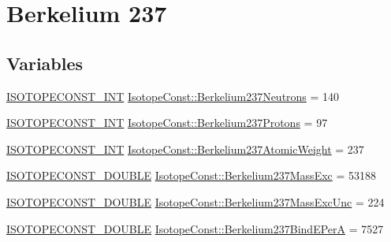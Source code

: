 \hypertarget{group___isotope_const-_berkelium-_bk237}{}\section{Berkelium 237}
\label{group___isotope_const-_berkelium-_bk237}
\subsection*{Variables}
\begin{DoxyCompactItemize}
\item 
\mbox{\hyperlink{group___isotope_const-_macros_ga5f18360b3e99483a35c32d789e62621c}{I\+S\+O\+T\+O\+P\+E\+C\+O\+N\+S\+T\+\_\+\+I\+NT}} \mbox{\hyperlink{group___isotope_const-_berkelium-_bk237_gae95d269089a2bb50e2aa6d2c2cc1bcd0}{Isotope\+Const\+::\+Berkelium237\+Neutrons}} = 140
\item 
\mbox{\hyperlink{group___isotope_const-_macros_ga5f18360b3e99483a35c32d789e62621c}{I\+S\+O\+T\+O\+P\+E\+C\+O\+N\+S\+T\+\_\+\+I\+NT}} \mbox{\hyperlink{group___isotope_const-_berkelium-_bk237_ga036c18d60d24a4ad4eab319d7913ff23}{Isotope\+Const\+::\+Berkelium237\+Protons}} = 97
\item 
\mbox{\hyperlink{group___isotope_const-_macros_ga5f18360b3e99483a35c32d789e62621c}{I\+S\+O\+T\+O\+P\+E\+C\+O\+N\+S\+T\+\_\+\+I\+NT}} \mbox{\hyperlink{group___isotope_const-_berkelium-_bk237_ga5a668f442bee476a015ca5ce9e49564a}{Isotope\+Const\+::\+Berkelium237\+Atomic\+Weight}} = 237
\item 
\mbox{\hyperlink{group___isotope_const-_macros_ga8f45a7272ce02c0b4c65c44636ed719a}{I\+S\+O\+T\+O\+P\+E\+C\+O\+N\+S\+T\+\_\+\+D\+O\+U\+B\+LE}} \mbox{\hyperlink{group___isotope_const-_berkelium-_bk237_gae7065b0ab7fdc95f36bc361900e20461}{Isotope\+Const\+::\+Berkelium237\+Mass\+Exc}} = 53188
\item 
\mbox{\hyperlink{group___isotope_const-_macros_ga8f45a7272ce02c0b4c65c44636ed719a}{I\+S\+O\+T\+O\+P\+E\+C\+O\+N\+S\+T\+\_\+\+D\+O\+U\+B\+LE}} \mbox{\hyperlink{group___isotope_const-_berkelium-_bk237_ga67ecd9a6124dbbe97a1c5bd67759c0fc}{Isotope\+Const\+::\+Berkelium237\+Mass\+Exc\+Unc}} = 224
\item 
\mbox{\hyperlink{group___isotope_const-_macros_ga8f45a7272ce02c0b4c65c44636ed719a}{I\+S\+O\+T\+O\+P\+E\+C\+O\+N\+S\+T\+\_\+\+D\+O\+U\+B\+LE}} \mbox{\hyperlink{group___isotope_const-_berkelium-_bk237_gac90ee2c9502fab459003f0cda3715ef3}{Isotope\+Const\+::\+Berkelium237\+Bind\+E\+PerA}} = 7527
\item 

\end{DoxyCompactItemize}
